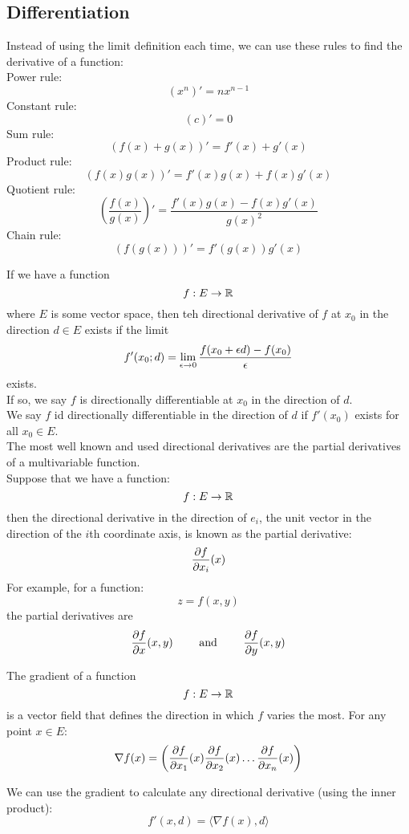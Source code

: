 \documentclass[12pt]{article}
\begin{document}
    \newpage

    \subsection*{Differentiation}

    Instead of using the limit definition each time,
    we can use these rules to find the derivative
    of a function: \\
    Power rule: \[ (x^n)' = nx^{n-1} \]
    Constant rule: \[ (c)' = 0  \]
    Sum rule: \[ (f(x) + g(x))' = f'(x) + g'(x) \]
    Product rule: \[ (f(x)g(x))' = f'(x)g(x) + f(x)g'(x) \]
    Quotient rule: \[ \left(\dfrac{f(x)}{g(x)}\right)' =
    \dfrac{f'(x)g(x) - f(x)g'(x)}{g(x)^2} \]
    Chain rule: \[ (f(g(x)))' = f'(g(x))g'(x) \]

    If we have a function
    \[ f: E \to \mathbb{R} \]
    where $E$ is some vector space,
    then teh directional derivative of $f$
    at $x_0$ in the direction $d \in E$
    exists if the limit
    \[ f'(x_0; d) = \lim_{\epsilon \to 0} 
        \dfrac{f(x_0+\epsilon d) - f(x_0)}{\epsilon}
   \]
    exists. \\
    If so, we say $f$ is directionally differentiable
    at $x_0$ in the direction of $d$. \\
    We say $f$ id directionally differentiable
    in the direction of $d$
    if $f'(x_0)$ exists for all $x_0 \in E$. \\

    The most well known and used directional
    derivatives are the partial derivatives of a
    multivariable function. \\
    Suppose that we have a function:
    \[ f: E \to \mathbb{R} \]
    then the directional derivative in the direction 
    of $e_i$,
    the unit vector in the direction of the $i$th
    coordinate axis,
    is known as the partial derivative:
    \[ \dfrac{\partial f}{\partial x_i}(x)\]
    For example, for a function:
    \[ z = f(x, y) \]
    the partial derivatives are
    \[ \dfrac{\partial f}{\partial x}(x, y) \qquad \text{ and } 
    \qquad \dfrac{\partial f}{\partial y}(x, y) \]

    The gradient of a function
    \[ f: E \to \mathbb{R} \]
    is a vector field
    that defines the direction in which
    $f$ varies the most.
    For any point $x \in E$:
    \[ \nabla f(x) =
    \left( \dfrac{\partial f}{\partial x_1}(x)
    \dfrac{\partial f}{\partial x_2}(x) 
    \dots \dfrac{\partial f}{\partial x_n}(x) \right) \]

    We can use the gradient to calculate any
    directional derivative (using the inner product):
    \[ f'(x, d) = \langle \nabla f(x), d \rangle \]
\end{document}
